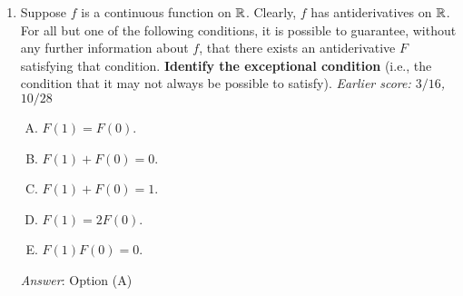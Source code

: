 \documentclass[10pt]{amsart}
\begin{document}
\begin{enumerate}
  \begin{enumerate}[(A)]
  \item $k - 2$
  \item $k - 1$
  \item $k$
  \item $k + 1$
  \item There is no bound in terms of $k$.
  \end{enumerate}

  {\em Answer}: Option (B)

  {\em Explanation}: $F$ and $G$ having the same $k^{th}$ derivative
  is equivalent to requiring that $F - G$ have $k^{th}$ derivative
  equal to zero. For $k = 1$, this gives constant functions
  (polynomials of degree $0$). Each time we increment $k$, the degree
  of the polynomial could potentially go up by $1$. Thus, the answer
  is $k - 1$.

  {\em Performance review}: $21$ out of $24$ got this. $2$ chose (A),
  $1$ chose (E).

  {\em Historical note 1}: $8$ out of $20$ people got this
  correct. $6$ chose (D), $3$ chose (C), $2$ chose (E), $1$ chose (A).

  {\em Historical note 2}: In the last appearance in a 153 quiz, $10$
  out of $28$ people got this correct. $5$ people each chose (D) and
  (E) and $4$ people each chose (A) and (C).

  {\em Action point}: This is a question you really {\em should} get
  correct!
\item Suppose $f$ is a continuous function on $\mathbb{R}$. Clearly, $f$ has
  antiderivatives on $\mathbb{R}$. For all but one of the following
  conditions, it is possible to guarantee, without any further
  information about $f$, that there exists an antiderivative $F$
  satisfying that condition. {\bf Identify the exceptional condition}
  (i.e., the condition that it may not always be possible to
  satisfy). {\em Earlier score: $3/16$, $10/28$}

  \begin{enumerate}[(A)]
  \item $F(1) = F(0)$.
  \item $F(1) + F(0) = 0$.
  \item $F(1) + F(0) = 1$.
  \item $F(1) = 2F(0)$.
  \item $F(1)F(0) = 0$.
  \end{enumerate}

  {\em Answer}: Option (A)


\end{enumerate}
\end{document}
